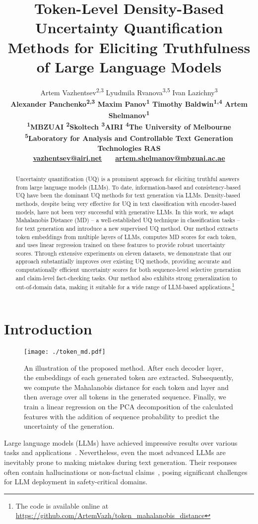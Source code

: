 \documentclass[11pt]{article}
\title{Token-Level Density-Based Uncertainty Quantification Methods for Eliciting Truthfulness of Large Language Models}
\author{
Artem Vazhentsev\textsuperscript{2,3} \quad
Lyudmila Rvanova\textsuperscript{3,5} \quad
Ivan Lazichny\textsuperscript{3} \enspace
\\
\bf Alexander Panchenko\textsuperscript{2,3}\quad
Maxim Panov\textsuperscript{1}\quad
Timothy Baldwin\textsuperscript{1,4}\quad
Artem Shelmanov\textsuperscript{1}\\
\textsuperscript{1}MBZUAI \;
\textsuperscript{2}Skoltech \; 
\textsuperscript{3}AIRI \;
\textsuperscript{4}The University of Melbourne \; \\
\textsuperscript{5}Laboratory for Analysis and Controllable Text Generation Technologies RAS \; 
\\
\href{mailto:vazhentsev@airi.net}{vazhentsev@airi.net} ~~ 
\href{mailto:artem.shelmanov@mbzuai.ac.ae}{artem.shelmanov@mbzuai.ac.ae}
}
\begin{document}
\maketitle
\begin{abstract}
  Uncertainty quantification (UQ) is a prominent approach for eliciting truthful answers from large language models (LLMs). To date, information-based and consistency-based UQ have been the dominant UQ methods for text generation via LLMs. Density-based methods, despite being very effective for UQ in text classification with encoder-based models, have not been very successful with generative LLMs. In this work, we adapt Mahalanobis Distance (MD) -- a well-established UQ technique in classification tasks -- for text generation and introduce a new supervised UQ method. Our method extracts token embeddings from multiple layers of LLMs, computes MD scores for each token, and uses linear regression trained on these features to provide robust uncertainty scores. Through extensive experiments on eleven datasets, we demonstrate that our approach substantially improves over existing UQ methods, providing accurate and computationally efficient uncertainty scores for both sequence-level selective generation and claim-level fact-checking tasks. Our method also exhibits strong generalization to out-of-domain data, making it suitable for a wide range of LLM-based applications.\footnote{The code is available online at \url{https://github.com/ArtemVazh/token_mahalanobis_distance}}
\end{abstract}


\section{Introduction}

  \begin{figure*}[t!]
    \centering
    \texttt{[image: ./token\_md.pdf]}
    \caption{
    An illustration of the proposed method. After each decoder layer, the embeddings of each generated token are extracted. Subsequently, we compute the Mahalanobis distance for each token and layer and then average over all tokens in the generated sequence. Finally, we train a linear regression on the PCA decomposition of the calculated features with the addition of sequence probability to predict the uncertainty of the generation.}
    \label{fig:tmd_scheme}
  \end{figure*}

  Large language models (LLMs) have achieved impressive results over various tasks and applications~\cite{openai2024gpt4technicalreport,llama3,gemma2}. Nevertheless, even the most advanced LLMs are inevitably prone to making mistakes during text generation. Their responses often contain hallucinations or non-factual claims~\cite{xiao-wang-2021-hallucination,dziri-etal-2022-origin}, posing significant challenges for LLM deployment in safety-critical domains. 
\end{document}
